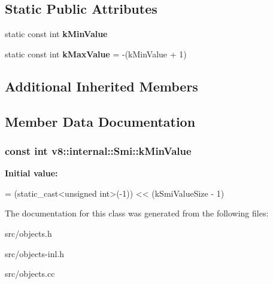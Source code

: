 \subsection*{Static Public Attributes}
\begin{DoxyCompactItemize}
\item 
static const int {\bfseries k\+Min\+Value}
\item 
\hypertarget{classv8_1_1internal_1_1_smi_a7551831ea8fb68fc44cc19c9b6fa0dee}{}static const int {\bfseries k\+Max\+Value} = -\/(k\+Min\+Value + 1)\label{classv8_1_1internal_1_1_smi_a7551831ea8fb68fc44cc19c9b6fa0dee}

\end{DoxyCompactItemize}
\subsection*{Additional Inherited Members}


\subsection{Member Data Documentation}
\hypertarget{classv8_1_1internal_1_1_smi_a98555c8d040a2a4881bd301a294d2969}{}
\subsubsection[{k\+Min\+Value}]{\setlength{\rightskip}{0pt plus 5cm}const int v8\+::internal\+::\+Smi\+::k\+Min\+Value\hspace{0.3cm}{\ttfamily [static]}}\label{classv8_1_1internal_1_1_smi_a98555c8d040a2a4881bd301a294d2969}
{\bfseries Initial value\+:}
\begin{DoxyCode}
=
      (\textcolor{keyword}{static\_cast<}\textcolor{keywordtype}{unsigned} \textcolor{keywordtype}{int}\textcolor{keyword}{>}(-1)) << (kSmiValueSize - 1)
\end{DoxyCode}


The documentation for this class was generated from the following files\+:\begin{DoxyCompactItemize}
\item 
src/objects.\+h\item 
src/objects-\/inl.\+h\item 
src/objects.\+cc\end{DoxyCompactItemize}
